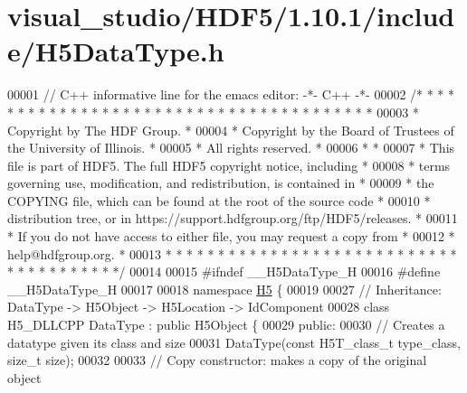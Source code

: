\hypertarget{visual__studio_2_h_d_f5_21_810_81_2include_2_h5_data_type_8h_source}{}\section{visual\+\_\+studio/\+H\+D\+F5/1.10.1/include/\+H5\+Data\+Type.h}
\label{visual__studio_2_h_d_f5_21_810_81_2include_2_h5_data_type_8h_source}

\begin{DoxyCode}
00001 \textcolor{comment}{// C++ informative line for the emacs editor: -*- C++ -*-}
00002 \textcolor{comment}{/* * * * * * * * * * * * * * * * * * * * * * * * * * * * * * * * * * * * * * *}
00003 \textcolor{comment}{ * Copyright by The HDF Group.                                               *}
00004 \textcolor{comment}{ * Copyright by the Board of Trustees of the University of Illinois.         *}
00005 \textcolor{comment}{ * All rights reserved.                                                      *}
00006 \textcolor{comment}{ *                                                                           *}
00007 \textcolor{comment}{ * This file is part of HDF5.  The full HDF5 copyright notice, including     *}
00008 \textcolor{comment}{ * terms governing use, modification, and redistribution, is contained in    *}
00009 \textcolor{comment}{ * the COPYING file, which can be found at the root of the source code       *}
00010 \textcolor{comment}{ * distribution tree, or in https://support.hdfgroup.org/ftp/HDF5/releases.  *}
00011 \textcolor{comment}{ * If you do not have access to either file, you may request a copy from     *}
00012 \textcolor{comment}{ * help@hdfgroup.org.                                                        *}
00013 \textcolor{comment}{ * * * * * * * * * * * * * * * * * * * * * * * * * * * * * * * * * * * * * * */}
00014 
00015 \textcolor{preprocessor}{#ifndef \_\_H5DataType\_H}
00016 \textcolor{preprocessor}{#define \_\_H5DataType\_H}
00017 
00018 \textcolor{keyword}{namespace }\hyperlink{namespace_h5}{H5} \{
00019 
00027 \textcolor{comment}{//  Inheritance: DataType -> H5Object -> H5Location -> IdComponent}
00028 \textcolor{keyword}{class }H5\_DLLCPP DataType : \textcolor{keyword}{public} H5Object \{
00029    \textcolor{keyword}{public}:
00030         \textcolor{comment}{// Creates a datatype given its class and size}
00031         DataType(\textcolor{keyword}{const} H5T\_class\_t type\_class, \textcolor{keywordtype}{size\_t} size);
00032 
00033         \textcolor{comment}{// Copy constructor: makes a copy of the original object}

\end{DoxyCode}
